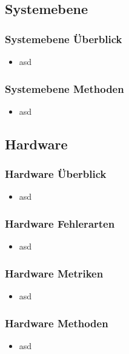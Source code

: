 \documentclass[]{beamer}
\begin{document}
\subsection{Systemebene}
\begin{frame}
\frametitle{Systemebene Überblick}

\begin{itemize}
    \item asd
\end{itemize}

\end{frame}

\begin{frame}
\frametitle{Systemebene Methoden}

\begin{itemize}
    \item asd
\end{itemize}

\end{frame}





\subsection{Hardware}
\begin{frame}
\frametitle{Hardware Überblick}

\begin{itemize}
    \item asd
\end{itemize}

\end{frame}

\begin{frame}
\frametitle{Hardware Fehlerarten}

\begin{itemize}
    \item asd
\end{itemize}

\end{frame}

\begin{frame}
\frametitle{Hardware Metriken}

\begin{itemize}
    \item asd
\end{itemize}

\end{frame}

\begin{frame}
\frametitle{Hardware Methoden}

\begin{itemize}
    \item asd
\end{itemize}

\end{frame}
\end{document}

